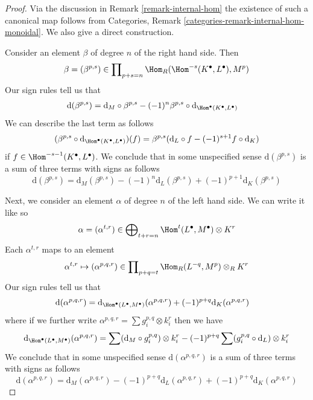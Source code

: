 \begin{proof}
Via the discussion in Remark \ref{remark-internal-hom} the existence
of such a canonical map follows from
Categories, Remark \ref{categories-remark-internal-hom-monoidal}.
We also give a direct construction.

\medskip\noindent
Consider an element $\beta$ of degree $n$ of the right hand side.
Then
$$
\beta = (\beta^{p, s}) \in
\prod\nolimits_{p + s = n} \Hom_R(\Hom^{-s}(K^\bullet, L^\bullet), M^p)
$$
Our sign rules tell us that
\begin{align*}
\text{d}(\beta^{p, s})
& =
\text{d}_M \circ \beta^{p, s}
- (-1)^n \beta^{p, s} \circ
\text{d}_{\Hom^\bullet(K^\bullet, L^\bullet)}
\end{align*}
We can describe the last term as follows
$$
(\beta^{p, s} \circ \text{d}_{\Hom^\bullet(K^\bullet, L^\bullet)})(f) =
\beta^{p, s}(\text{d}_L \circ f - (-1)^{s + 1} f \circ \text{d}_K)
$$
if $f \in \Hom^{-s - 1}(K^\bullet, L^\bullet)$. We conclude that in
some unspecified sense $\text{d}(\beta^{p, s})$ is a sum of three terms
with signs as follows
\begin{equation}
\label{equation-beta}
\text{d}(\beta^{p, s}) =
\text{d}_M(\beta^{p, s})
-(-1)^n\text{d}_L(\beta^{p, s}) +
(-1)^{p + 1}\text{d}_K(\beta^{p, s})
\end{equation}

\noindent
Next, we consider an element $\alpha$ of degree $n$ of the left hand side.
We can write it like so
$$
\alpha = (\alpha^{t, r}) \in
\bigoplus\nolimits_{t + r = n} \Hom^t(L^\bullet, M^\bullet) \otimes K^r
$$
Each $\alpha^{t, r}$ maps to an element
$$
\alpha^{t, r} \mapsto (\alpha^{p, q, r}) \in
\prod\nolimits_{p + q = t} \Hom_R(L^{-q}, M^p) \otimes_R K^r
$$
Our sign rules tell us that
\begin{align*}
\text{d}(\alpha^{p, q, r})
& =
\text{d}_{\Hom^\bullet(L^\bullet, M^\bullet)}(\alpha^{p, q, r})
+ (-1)^{p + q} \text{d}_K(\alpha^{p, q, r})
\end{align*}
where if we further write $\alpha^{p, q, r} = \sum g_i^{p, q} \otimes k_i^r$
then we have
$$
\text{d}_{\Hom^\bullet(L^\bullet, M^\bullet)}(\alpha^{p, q, r}) =
\sum (\text{d}_M \circ g_i^{p, q}) \otimes k_i^r
- (-1)^{p + q} \sum (g_i^{p, q} \circ \text{d}_L) \otimes k_i^r
$$
We conclude that in some unspecified sense $\text{d}(\alpha^{p, q, r})$
is a sum of three terms with signs as follows
\begin{equation}
\label{equation-alpha}
\text{d}(\alpha^{p, q, r}) =
\text{d}_M(\alpha^{p, q, r})
-(-1)^{p + q}\text{d}_L(\alpha^{p, q, r}) +
(-1)^{p + q}\text{d}_K(\alpha^{p, q, r})
\end{equation}


\end{proof}
